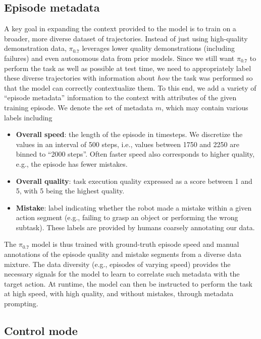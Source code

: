 \documentclass[conference]{IEEEtran}
\def \MethodName {$\pi_{0.7}$}
\begin{document}
\subsection{Episode metadata}
\label{subsec:metadata}

A key goal in expanding the context provided to the model is to train on a broader, more diverse dataset of trajectories. Instead of just using high-quality demonstration data, \MethodName{} leverages lower quality demonstrations (including failures) and even autonomous data from prior models. Since we still want \MethodName{} to perform the task as well as possible at test time, we need to appropriately label these diverse trajectories with information about \emph{how} the task was performed so that the model can correctly contextualize them. To this end, we add a variety of ``episode metadata'' information to the context with attributes of the given training episode. We denote the set of metadata $m$, which may contain various labels including



\begin{itemize}[leftmargin=10pt]
    \item \textbf{Overall speed}: the length of the episode in timesteps. We discretize the values in an interval of 500 steps, i.e., values between 1750 and 2250 are binned to ``2000 steps''. Often faster speed also corresponds to higher quality, e.g., the episode has fewer mistakes.
    \item \textbf{Overall quality}: task execution quality expressed as a score between 1 and 5, with 5 being the highest quality.
    \item \textbf{Mistake}: label indicating whether the robot made a mistake within a given action segment (e.g., failing to grasp an object or performing the wrong subtask). These labels are provided by humans coarsely annotating our data.
\end{itemize}

The \MethodName{} model is thus trained with ground-truth episode speed and manual annotations of the episode quality and mistake segments from a diverse data mixture. The data diversity (e.g., episodes of varying speed) provides the necessary signals for the model to learn to correlate such metadata with the target action.
At runtime, the model can then be instructed to perform the task at high speed, with high quality, and without mistakes, through metadata prompting.

\subsection{Control mode}
\end{document}
